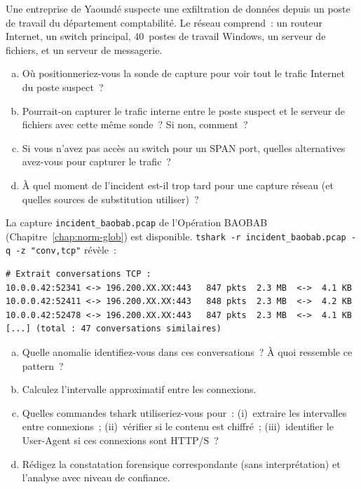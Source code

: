 \bigskip

\begin{boxexo}[title={\ding{45}\quad Exercice~15.1 --- Position de sonde \niveaubase}]
Une entreprise de Yaoundé suspecte une exfiltration de données depuis
un poste de travail du département comptabilité. Le réseau comprend~:
un routeur Internet, un switch principal, 40~postes de travail Windows,
un serveur de fichiers, et un serveur de messagerie.
\begin{enumerate}[(a)]
    \item Où positionneriez-vous la sonde de capture pour voir tout
          le trafic Internet du poste suspect~?
    \item Pourrait-on capturer le trafic interne entre le poste suspect
          et le serveur de fichiers avec cette même sonde~? Si non, comment~?
    \item Si vous n'avez pas accès au switch pour un SPAN port, quelles
          alternatives avez-vous pour capturer le trafic~?
    \item À quel moment de l'incident est-il trop tard pour une capture
          réseau (et quelles sources de substitution utiliser)~?
\end{enumerate}
\end{boxexo}

\begin{boxexo}[title={\ding{45}\quad Exercice~15.2 --- Analyse de capture \niveaumoyen}]
La capture \texttt{incident\_baobab.pcap} de l'Opération BAOBAB
(Chapitre~\ref{chap:norm-glob}) est disponible. \texttt{tshark -r
incident\_baobab.pcap -q -z "conv,tcp"} révèle~:
\begin{lstlisting}[language=bash_forensique]
# Extrait conversations TCP :
10.0.0.42:52341 <-> 196.200.XX.XX:443   847 pkts  2.3 MB  <->  4.1 KB
10.0.0.42:52411 <-> 196.200.XX.XX:443   848 pkts  2.3 MB  <->  4.2 KB
10.0.0.42:52478 <-> 196.200.XX.XX:443   847 pkts  2.3 MB  <->  4.1 KB
[...] (total : 47 conversations similaires)
\end{lstlisting}
\begin{enumerate}[(a)]
    \item Quelle anomalie identifiez-vous dans ces conversations~?
          À quoi ressemble ce pattern~?
    \item Calculez l'intervalle approximatif entre les connexions.
    \item Quelles commandes tshark utiliseriez-vous pour~: (i)~extraire
          les intervalles entre connexions~; (ii)~vérifier si le
          contenu est chiffré~; (iii)~identifier le User-Agent si
          ces connexions sont HTTP/S~?
    \item Rédigez la constatation forensique correspondante (sans
          interprétation) et l'analyse avec niveau de confiance.
\end{enumerate}
\end{boxexo}

